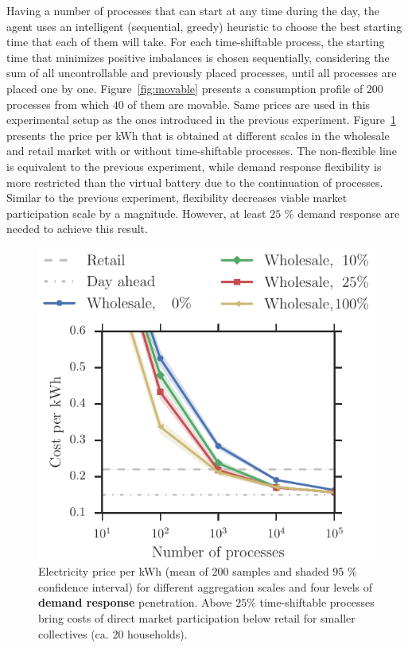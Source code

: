 \documentclass[conference]{IEEEtran}
\begin{document}
Having a number of processes that can start at any time during the day, the agent uses an intelligent (sequential, greedy) heuristic to choose the best starting time that each of them will take. For each time-shiftable process, the starting time that minimizes positive imbalances is chosen sequentially, considering the sum of all uncontrollable and previously placed processes, until all processes are placed one by one. Figure~\ref{fig:movable} presents a consumption profile of $200$ processes from which $40$ of them are movable. Same prices are used in this experimental setup as the ones introduced in the previous experiment. Figure~\ref{fig:wholesale_flex} presents the price per kWh that is obtained at different scales in the wholesale and retail market with or without time-shiftable processes. The non-flexible line is equivalent to the previous experiment, while demand response flexibility is more restricted than the virtual battery due to the continuation of processes. Similar to the previous experiment, flexibility decreases viable market participation scale by a magnitude. However, at least $25$ \% demand response are needed to achieve this result.

\begin{figure}[!t]
\centering
\includegraphics[width=0.9\columnwidth]{figures/Wholesale_flex.pdf}
\caption{Electricity price per kWh (mean of 200 samples and shaded 95 \% confidence interval) for different aggregation scales and four levels of \textbf{demand response} penetration. Above $25 \%$ time-shiftable processes bring costs of direct market participation below retail for smaller collectives (ca. 20 households).}
\label{fig:wholesale_flex}
\end{figure}
\end{document}
